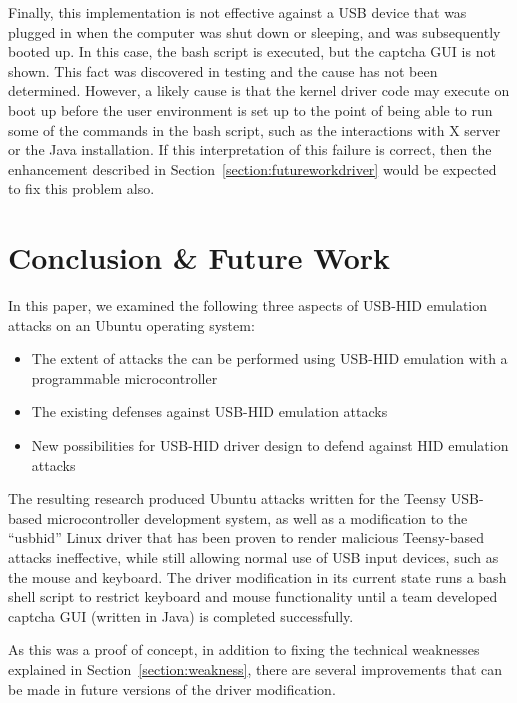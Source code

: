 \documentclass[pagenumbers]{ieee}
\begin{document}
Finally, this implementation is not effective against a USB device that was plugged in when the computer was shut down or sleeping, and was subsequently booted up.  In this case, the bash script is executed, but the captcha GUI is not shown. This fact was discovered in testing and the cause has not been determined. However, a likely cause is that the kernel driver code may execute on boot up before the user environment is set up to the point of being able to run some of the commands in the bash script, such as the interactions with X server or the Java installation. If this interpretation of this failure is correct, then the enhancement described in Section~\ref{section:futureworkdriver} would be expected to fix this problem also.


\section{Conclusion \& Future Work}
\label{section:conclusion}

In this paper, we examined the following three aspects of USB-HID emulation attacks on an Ubuntu operating system:

\begin{itemize}
\item The extent of attacks the can be performed using USB-HID emulation with a programmable microcontroller
\item The existing defenses against USB-HID emulation attacks
\item New possibilities for USB-HID driver design to defend against HID emulation attacks
\end{itemize}

The resulting research produced Ubuntu attacks written for the Teensy USB-based microcontroller development system, as well as a modification to the ``usbhid'' Linux driver that has been proven to render malicious Teensy-based attacks ineffective, while still allowing normal use of USB input devices, such as the mouse and keyboard. The driver modification in its current state runs a bash shell script to restrict keyboard and mouse functionality until a team developed captcha GUI (written in Java) is completed successfully.

As this was a proof of concept, in addition to fixing the technical weaknesses explained in Section~\ref{section:weakness}, there are several improvements that can be made in future versions of the driver modification.
\end{document}

